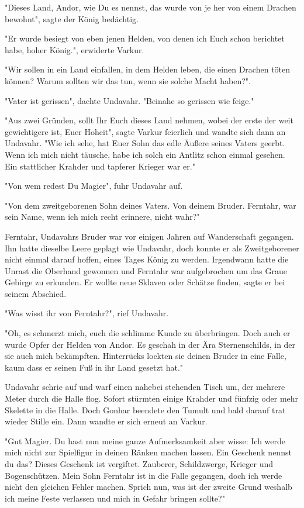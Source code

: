 \documentclass[10pt, a4paper, oneside]{book}
\begin{document}
\begin{multicols}{2}
"Dieses Land, Andor, wie Du es nennst, das wurde von je her von einem Drachen bewohnt", sagte der König bedächtig.

"Er wurde besiegt von eben jenen Helden, von denen ich Euch schon berichtet habe, hoher König.", erwiderte Varkur.

"Wir sollen in ein Land einfallen, in dem Helden leben, die einen Drachen töten können?  Warum sollten wir das tun, wenn sie solche Macht haben?".

"Vater ist gerissen", dachte Undavahr. "Beinahe so gerissen wie feige."

"Aus zwei Gründen, sollt Ihr Euch dieses Land nehmen, wobei der erste der weit gewichtigere ist, Euer Hoheit", sagte Varkur feierlich und wandte sich dann an Undavahr. "Wie ich sehe, hat Euer Sohn das edle Äußere seines Vaters geerbt. Wenn ich mich nicht täusche, habe ich solch ein Antlitz schon einmal gesehen. Ein stattlicher Krahder und tapferer Krieger war er."

"Von wem redest Du Magier", fuhr Undavahr auf.

"Von dem zweitgeborenen Sohn deines Vaters. Von deinem Bruder. Ferntahr, war sein Name, wenn ich mich recht erinnere, nicht wahr?"\bigskip

Ferntahr, Undavahrs Bruder war vor einigen Jahren auf Wanderschaft gegangen. Ihn hatte dieselbe Leere geplagt wie Undavahr, doch konnte er als Zweitgeborener nicht einmal darauf hoffen, eines Tages König zu werden. Irgendwann hatte die Unrast die Oberhand gewonnen und Ferntahr war aufgebrochen um das Graue Gebirge zu erkunden. Er wollte neue Sklaven oder Schätze finden, sagte er bei seinem Abschied.\bigskip

"Was wisst ihr von Ferntahr?", rief Undavahr.

"Oh, es schmerzt mich, euch die schlimme Kunde zu überbringen. Doch auch er wurde Opfer der  Helden von Andor. Es geschah in der Ära Sternenschilds, in der sie auch mich bekämpften. Hinterrücks lockten sie deinen Bruder in eine Falle, kaum dass er seinen Fuß in ihr Land gesetzt hat."

Undavahr schrie auf und warf einen nahebei stehenden Tisch um, der mehrere Meter durch die Halle flog. Sofort stürmten einige Krahder und fünfzig oder mehr Skelette in die Halle. Doch Gonhar beendete den Tumult und bald darauf trat wieder Stille ein. Dann wandte er sich erneut an Varkur.\bigskip

"Gut Magier. Du hast nun meine ganze Aufmerksamkeit aber wisse: Ich werde mich nicht zur Spielfigur in deinen Ränken machen lassen. Ein Geschenk nennst du das? Dieses Geschenk ist vergiftet. Zauberer, Schildzwerge, Krieger und Bogenschützen. Mein Sohn Ferntahr ist in die Falle gegangen, doch ich werde nicht den gleichen Fehler machen. Sprich nun, was ist der zweite Grund weshalb ich meine Feste verlassen und mich in Gefahr bringen sollte?"


\end{multicols}
\end{document}
